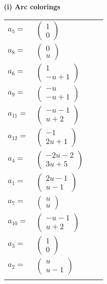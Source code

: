 \documentclass[1p]{elsarticle_modified}
\theoremstyle{definition}
\begin{document}
\flushleft \textbf{(i) Arc colorings}\\
\begin{tabular}{m{7pt} m{180pt} m{7pt} m{180pt} }
\flushright $a_{5}=$&$\begin{pmatrix}1\\0\end{pmatrix}$ \\
\flushright $a_{8}=$&$\begin{pmatrix}0\\u\end{pmatrix}$ \\
\flushright $a_{6}=$&$\begin{pmatrix}1\\- u+1\end{pmatrix}$ \\
\flushright $a_{9}=$&$\begin{pmatrix}- u\\- u+1\end{pmatrix}$ \\
\flushright $a_{11}=$&$\begin{pmatrix}- u-1\\u+2\end{pmatrix}$ \\
\flushright $a_{12}=$&$\begin{pmatrix}-1\\2 u+1\end{pmatrix}$ \\
\flushright $a_{4}=$&$\begin{pmatrix}-2 u-2\\3 u+5\end{pmatrix}$ \\
\flushright $a_{1}=$&$\begin{pmatrix}2 u-1\\u-1\end{pmatrix}$ \\
\flushright $a_{7}=$&$\begin{pmatrix}u\\u\end{pmatrix}$ \\
\flushright $a_{10}=$&$\begin{pmatrix}- u-1\\u+2\end{pmatrix}$ \\
\flushright $a_{3}=$&$\begin{pmatrix}1\\0\end{pmatrix}$ \\
\flushright $a_{2}=$&$\begin{pmatrix}u\\u-1\end{pmatrix}$\\&\end{tabular}
\end{document}
